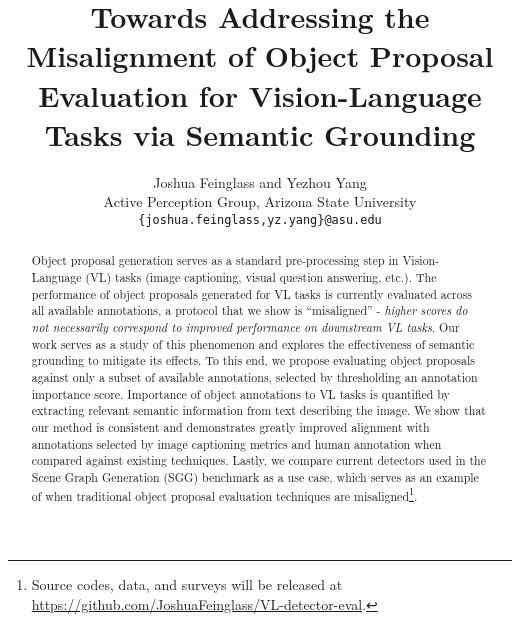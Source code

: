 \documentclass[10pt,twocolumn,letterpaper]{article}
\begin{document}
\title{Towards Addressing the Misalignment of Object Proposal Evaluation for Vision-Language Tasks via Semantic Grounding}

\author{Joshua Feinglass and Yezhou Yang\\
Active Perception Group, Arizona State University\\
{\tt\small \{joshua.feinglass,yz.yang\}@asu.edu}
}
\maketitle
\begin{abstract}
Object proposal generation serves as a standard pre-processing step in Vision-Language (VL) tasks (image captioning, visual question answering, etc.). The performance of object proposals generated for VL tasks is currently evaluated across all available annotations, a protocol that we show is ``misaligned'' - {\it  higher scores do not necessarily correspond to improved performance on downstream VL tasks}. Our work serves as a study of this phenomenon and explores the effectiveness of semantic grounding to mitigate its effects. To this end, we propose evaluating object proposals against only a subset of available annotations, selected by thresholding an annotation importance score. Importance of object annotations to VL tasks is quantified by extracting relevant semantic information from text describing the image. We show that our method is consistent and demonstrates greatly improved alignment with annotations selected by image captioning metrics and human annotation when compared against existing techniques. Lastly, we compare current detectors used in the Scene Graph Generation (SGG) benchmark as a use case, which serves as an example of when traditional object proposal evaluation techniques are misaligned\footnote{Source codes, data, and surveys will be released at \url{https://github.com/JoshuaFeinglass/VL-detector-eval}.}.
\end{abstract}
\end{document}
